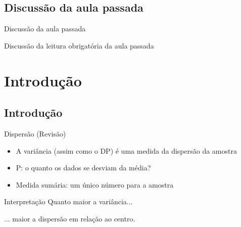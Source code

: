 \documentclass{beamer}
\begin{document}
\subsection{Discussão da aula passada}

\begin{frame}{Discussão da aula passada}
  \begin{block}{}
    Discussão da leitura obrigatória da aula passada
  \end{block}
\end{frame}

\section{Introdução}

\subsection[Intro]{Introdução}

\begin{frame}{Dispersão (Revisão)}
  \begin{itemize}
    \small
  \item A variância (assim como o DP) é uma medida da dispersão da
    amostra
  \item P: o quanto os dados se desviam da média?
  \item Medida sumária: um único número para a amostra
  \end{itemize}
  \bigskip
  \begin{block}{Interpretação}
    \small
    Quanto maior a variância...

  \bigskip
    ... maior a dispersão em relação ao centro.
  \end{block}
\end{frame}
\end{document}
